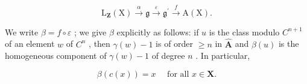 \[
\mathrm{L} _ {\mathbf {Z}} (\mathrm{X}) \stackrel {{\alpha}} {{\longrightarrow}} \mathfrak {g} \stackrel {{\varepsilon}} {{\longrightarrow}} \mathfrak {g} ^ {\prime} \stackrel {{f}} {{\longrightarrow}} \mathrm{A} (\mathrm{X}).
\]

We write \(\beta = f\circ \varepsilon\) ; we give \(\beta\) explicitly as follows: if \(u\) is the class modulo \(C^{n + 1}\) of an element \(w\) of \(C^n\) , then \(\gamma (w) - 1\) is of order \(\geqslant n\) in \(\hat{\mathbf{A}}\) and \(\beta (u)\) is the homogeneous component of \(\gamma (w) - 1\) of degree \(n\) . In particular,

\[
\beta (c (x)) = x \quad \text { for   all } x \in \mathbf {X}.\tag{3}
\]
